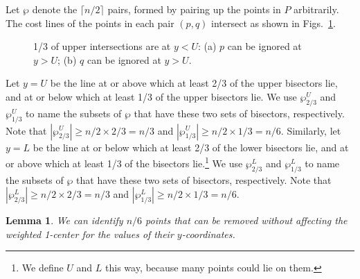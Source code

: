 \documentclass[preprint,10pt]{elsarticle}
\newtheorem{lemma}{Lemma}
\begin{document}
Let $\wp$ denote the $\lceil n/2\rceil$ pairs,
formed by pairing up the points in $P$ arbitrarily.
The cost lines of the points in each pair $(p,q)$ intersect
as shown in Figs.~\ref{fig:2points1}.
\begin{figure}[h]
\centering
{}
\hspace{2mm}
\caption{1/3 of upper intersections are at $y<U$:
(a) $p$ can be ignored at $y>U$; (b) $q$ can be ignored at $y>U$.
}
\label{fig:2points1}
\end{figure}
Let $y=U$ be the line at or above which at least 2/3 of the upper bisectors lie,
and at or below which at least 1/3 of the upper bisectors lie.
We use $\wp^U_{2/3}$ and $\wp^U_{1/3}$ to name the subsets of
 $\wp$ that have these two sets of bisectors, respectively.
 Note that $|\wp^U_{2/3}|\geq n/2\times 2/3 = n/3$ and $|\wp^U_{1/3}|\geq n/2\times 1/3 = n/6$.
Similarly, let  $y=L$ be the line at or below which at least 2/3 of the  
lower bisectors lie,
and  at or above which at least 1/3 of the bisectors lie.\footnote{{We define $U$ and $L$ this way,
because many points could lie on them.}}
We use $\wp^L_{2/3}$ and $\wp^L_{1/3}$ to name the subsets of
$\wp$ that have these two sets of bisectors, respectively.
 Note that $|\wp^L_{2/3}|\geq n/2\times 2/3 = n/3$ and $|\wp^L_{1/3}|\geq n/2\times 1/3 = n/6$.
\begin{lemma} \label{lem:one6th}
We can identify $n/6$ points that can be removed without affecting the weighted 1-center
 for the values
of their $y$-coordinates.
\end{lemma}
\end{document}
